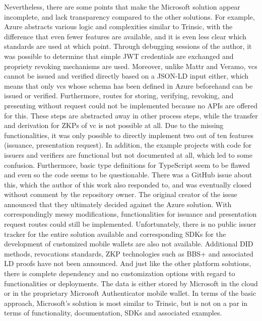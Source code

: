         Nevertheless, there are some points that make the Microsoft solution appear incomplete, and lack transparency compared to the other solutions. For example, Azure abstracts various logic and complexities similar to Trinsic, with the difference that even fewer features are available, and it is even less clear which standards are used at which point. Through debugging sessions of the author, it was possible to determine that simple JWT credentials are exchanged and propriety revoking mechanisms are used. Moreover, unlike Mattr and Veramo, \acp{vc} cannot be issued and verified directly based on a JSON-LD input either, which means that only \acp{vc} whose schema has been defined in Azure beforehand can be issued or verified. Furthermore, routes for storing, verifying, revoking, and presenting without request could not be implemented because no APIs are offered for this. These steps are abstracted away in other process steps, while the transfer and derivation for \acp{ZKP} of \ac{vc} is not possible at all. Due to the missing functionalities, it was only possible to directly implement two out of ten features (issuance, presentation request). In addition, the example projects with code for issuers and verifiers are functional but not documented at all, which led to some confusion. Furthermore, basic type definitions for TypeScript seem to be flawed and even so the code seems to be questionable. There was a GitHub issue \cite{yegupov_demo_2021} about this, which the author of this work also responded to, and was eventually closed without comment by the repository owner. The original creator of the issue announced that they ultimately decided against the Azure solution. With correspondingly messy modifications, functionalities for issuance and presentation request routes could still be implemented. Unfortunately, there is no public issuer tracker for the entire solution available and corresponding SDKs for the development of customized mobile wallets are also not available. Additional \ac{DID} methods, revocations standards, \ac{ZKP} technologies such as BBS+ and associated LD proofs have not been announced. And just like the other platform solutions, there is complete dependency and no customization options with regard to functionalities or deployments. The data is either stored by Microsoft in the cloud or in the proprietary Microsoft Authenticator mobile wallet. In terms of the basic approach, Microsoft's solution is most similar to Trinsic, but is not on a par in terms of functionality, documentation, SDKs and associated examples.

